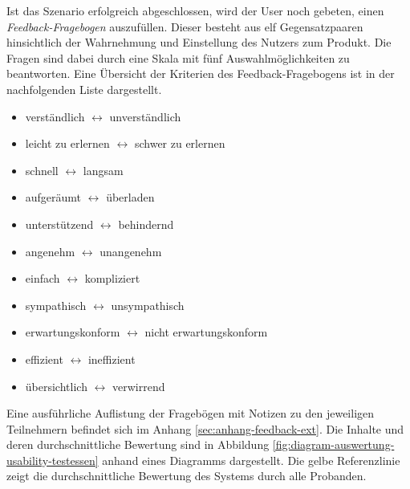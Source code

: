Ist das Szenario erfolgreich abgeschlossen, wird der User noch gebeten, einen \textit{Feedback-Fragebogen} auszufüllen. Dieser besteht aus elf Gegensatzpaaren hinsichtlich der Wahrnehmung und Einstellung des Nutzers zum Produkt. Die Fragen sind dabei durch eine Skala mit fünf Auswahlmöglichkeiten zu beantworten. Eine Übersicht der Kriterien des Feedback-Fragebogens ist in der nachfolgenden Liste dargestellt.

\begin{itemize}
    \setlength{\itemindent}{0.5cm}
    \item verständlich $\longleftrightarrow$ unverständlich
    \item leicht zu erlernen $\longleftrightarrow$ schwer zu erlernen
    \item schnell $\longleftrightarrow$ langsam
    \item aufgeräumt $\longleftrightarrow$ überladen
    \item unterstützend $\longleftrightarrow$ behindernd
    \item angenehm $\longleftrightarrow$ unangenehm
    \item einfach $\longleftrightarrow$ kompliziert
    \item sympathisch $\longleftrightarrow$ unsympathisch
    \item erwartungskonform $\longleftrightarrow$ nicht erwartungskonform 
    \item effizient $\longleftrightarrow$ ineffizient 
    \item übersichtlich $\longleftrightarrow$ verwirrend 
\end{itemize}

Eine ausführliche Auflistung der Fragebögen mit Notizen zu den jeweiligen Teilnehmern befindet sich im Anhang \ref{sec:anhang-feedback-ext}. Die Inhalte und deren durchschnittliche Bewertung sind in Abbildung \ref{fig:diagram-auswertung-usability-testessen} anhand eines Diagramms dargestellt. Die gelbe Referenzlinie zeigt die durchschnittliche Bewertung des Systems durch alle Probanden. 
\newline

